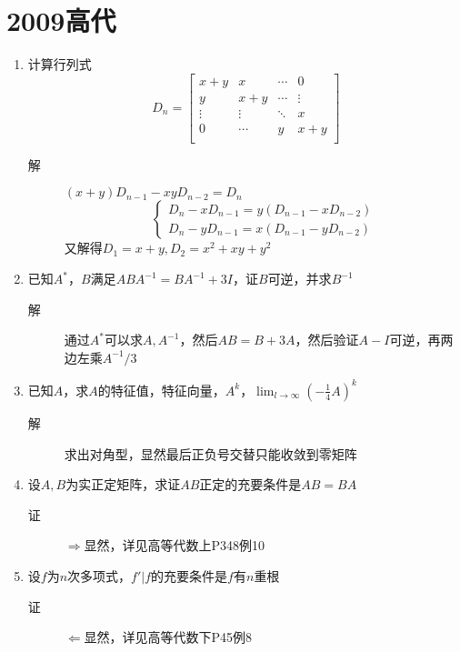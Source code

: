 \section{2009高代}
\begin{enumerate}
\item 计算行列式
\[
D_n =
\left[
\begin{array}{cccc}
x+y & x & \cdots & 0 \\
y & x+y & \cdots & \vdots \\
\vdots & \vdots & \ddots & x \\
0 & \cdots & y & x+y \\
\end{array}\right]
\]
\begin{description}
\item[解] $(x+y)D_{n-1}-xyD_{n-2}=D_n$
\[
\begin{cases}
D_n-xD_{n-1}=y(D_{n-1}-xD_{n-2})\\
D_n-yD_{n-1}=x(D_{n-1}-yD_{n-2})
\end{cases}
\]
又解得$D_1=x+y,D_2=x^2+xy+y^2$
\end{description}

\item 已知$A^*$，$B$满足$ABA^{-1}=BA^{-1}+3I$，证$B$可逆，并求$B^{-1}$
\begin{description}
\item[解] 通过$A^*$可以求$A,A^{-1}$，然后$AB=B+3A$，然后验证$A-I$可逆，再两边左乘$A^{-1}/3$
\end{description}

\item 已知$A$，求$A$的特征值，特征向量，$A^k$，$\lim_{l \to \infty}(-\frac{1}{4}A)^k$
\begin{description}
\item[解] 求出对角型，显然最后正负号交替只能收敛到零矩阵
\end{description}

\item 设$A,B$为实正定矩阵，求证$AB$正定的充要条件是$AB=BA$
\begin{description}
\item[证] $\Rightarrow$显然，详见高等代数上P348例10
\end{description}


\item 设$f$为$n$次多项式，$f'|f$的充要条件是$f$有$n$重根
\begin{description}
\item[证] $\Leftarrow$显然，详见高等代数下P45例8
\end{description}


\end{enumerate}
